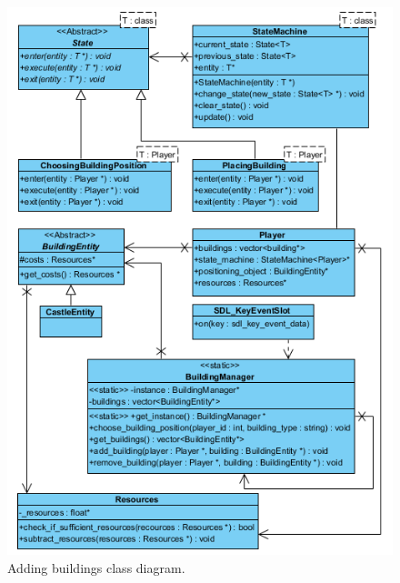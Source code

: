 \begin{figure}[H] 
    \centering
    \includegraphics{res/adding-buildings/States-ClassDiagram.png} 
    \caption{Adding buildings class diagram.}\label{fig:classdiagram-addingbuildings} 
\end{figure}
